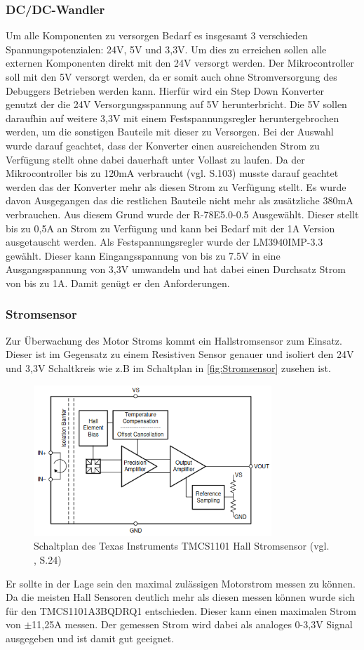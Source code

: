 \subsubsection{DC/DC-Wandler}
Um alle Komponenten zu versorgen Bedarf es insgesamt 3 verschieden Spannungspotenzialen: 24V, 5V und 3,3V. Um dies zu erreichen sollen alle externen Komponenten direkt mit den 24V versorgt werden. Der Mikrocontroller soll mit den 5V versorgt werden, da er somit auch ohne Stromversorgung des Debuggers Betrieben werden kann. Hierfür wird ein Step Down Konverter genutzt der die 24V Versorgungsspannung auf 5V herunterbricht. Die 5V sollen daraufhin auf weitere 3,3V mit einem Festspannungsregler heruntergebrochen werden, um die sonstigen Bauteile mit dieser zu Versorgen. Bei der Auswahl wurde darauf geachtet, dass der Konverter einen ausreichenden Strom zu Verfügung stellt ohne dabei dauerhaft unter Vollast zu laufen. Da der Mikrocontroller bis zu 120mA verbraucht (vgl. \cite{STM32_Electrical} S.103) musste darauf geachtet werden das der Konverter mehr als diesen Strom zu Verfügung stellt. Es wurde davon Ausgegangen das die restlichen Bauteile nicht mehr als zusätzliche 380mA verbrauchen. Aus diesem Grund wurde der R-78E5.0-0.5 Ausgewählt. Dieser stellt bis zu 0,5A an Strom zu Verfügung und kann bei Bedarf mit der 1A Version ausgetauscht werden. Als Festspannungsregler wurde der LM3940IMP-3.3 gewählt. Dieser kann Eingangsspannung von bis zu 7.5V in eine Ausgangsspannung von 3,3V umwandeln und hat dabei einen Durchsatz Strom von bis zu 1A. Damit genügt er den Anforderungen.
\subsubsection{Stromsensor}
Zur Überwachung des Motor Stroms kommt ein Hallstromsensor zum Einsatz. Dieser ist im Gegensatz zu einem Resistiven Sensor genauer und isoliert den 24V und 3,3V Schaltkreis wie z.B im Schaltplan in \autoref{fig:Stromsensor} zusehen ist. 
\begin{figure}[H]
	\centering
	\includegraphics[width=0.8\textwidth]{images/Hardware/Stromsensor_Schaltplan.png}
	\caption{Schaltplan des Texas Instruments TMCS1101 Hall Stromsensor (vgl. \cite{Stromsensor_texas}, S.24)}
	\label{fig:Stromsensor}
\end{figure}
Er sollte in der Lage sein den maximal zulässigen Motorstrom messen zu können. Da die meisten Hall Sensoren deutlich mehr als diesen messen können wurde sich für den TMCS1101A3BQDRQ1 entschieden. Dieser kann einen maximalen Strom von $\pm$11,25A messen. Der gemessen Strom wird dabei als analoges 0-3,3V Signal ausgegeben und ist damit gut geeignet.
